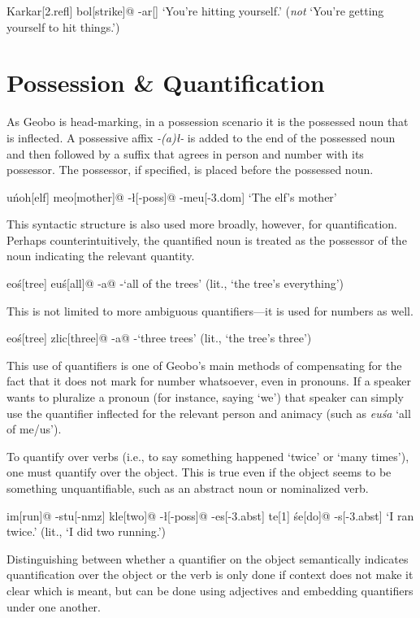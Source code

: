 \documentclass[a4paper,11pt,oneside,openany]{memoir}
\begin{document}
\ex
\begingl
Karkar[\sc 2.refl]
bol[strike]@
-ar[]
\glft  `You're hitting yourself.' (\emph{not} `You're getting yourself to hit things.')
\endgl
\xe

\section{Possession \& Quantification}

As Geobo{\engma} is head-marking, in a possession scenario it is the possessed noun that is inflected. A possessive affix \textit{-(a)\l-} is added to the end of the possessed noun and then followed by a suffix that agrees in person and number with its possessor. The possessor, if specified, is placed before the possessed noun.

\ex
\begingl
\vN u\'noh[elf]
meo[mother]@
-\l[\sc -poss]@
-meu[\sc -3.dom]
\glft  `The elf's mother'
\endgl
\xe

This syntactic structure is also used more broadly, however, for quantification. Perhaps counterintuitively, the quantified noun is treated as the possessor of the noun indicating the relevant quantity.

\ex
\begingl
\vD eo\'s[tree]
eu\'s[all]@
-a\dbl[\sc -poss]@
-\vn[\sc -3.quas]
\glft `all of the trees' (lit., `the tree's everything')
\endgl
\xe

This is not limited to more ambiguous quantifiers---it is used for numbers as well.

\ex
\begingl
\vD eo\'s[tree]
zlic[three]@
-a\dbl[\sc -poss]@
-\vn[\sc -3.quas]
\glft `three trees' (lit., `the tree's three')
\endgl
\xe

This use of quantifiers is one of Geobo{\engma}'s main methods of compensating for the fact that it does not mark for number whatsoever, even in pronouns. If a speaker wants to pluralize a pronoun (for instance, saying `we') that speaker can simply use the quantifier inflected for the relevant person and animacy (such as \textit{eu\'sa\dbl\vd} `all of me/us').

To quantify over verbs (i.e., to say something happened `twice' or `many times'), one must quantify over the object. This is true even if the object seems to be something unquantifiable, such as an abstract noun or nominalized verb.

\ex
\begingl
\vR im[run]@
-stu[\sc -nmz]
kle[two]@
-\l[\sc -poss]@
-es[\sc -3.abst]
te{\vd}[1]
\'se[do]@
-s[\sc -3.abst]
\glft `I ran twice.' (lit., `I did two running.')
\endgl
\xe

Distinguishing between whether a quantifier on the object semantically indicates quantification over the object or the verb is only done if context does not make it clear which is meant, but can be done using adjectives and embedding quantifiers under one another.
\end{document}
